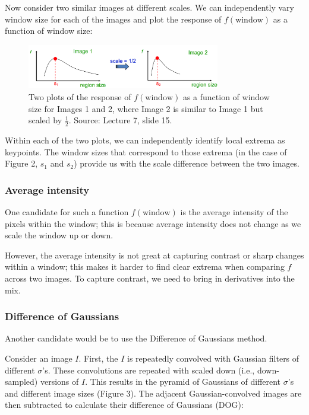 \documentclass{article}
\begin{document}
Now consider two similar images at different scales. We can independently vary window size for each of the images and plot the response of $f(\text{window})$ as a function of window size:

\begin{figure}[h]
  \centering
  \includegraphics[width=0.75\textwidth]{max}
  \caption{Two plots of the response of $f(\text{window})$ as a function of window size for Images 1 and 2, where Image 2 is similar to Image 1 but scaled by $\frac{1}{2}$. Source: Lecture 7, slide 15.}
\end{figure}

Within each of the two plots, we can independently identify local extrema as keypoints. The window sizes that correspond to those extrema (in the case of Figure 2, $s_1$ and $s_2$) provide us with the scale difference between the two images.

\subsubsection{Average intensity}
One candidate for such a function $f(\text{window})$ is the average intensity of the pixels within the window; this is because average intensity does not change as we scale the window up or down.

However, the average intensity is not great at capturing contrast or sharp changes within a window; this makes it harder to find clear extrema when comparing $f$ across two images. To capture contrast, we need to bring in derivatives into the mix.

\subsubsection{Difference of Gaussians}
Another candidate would be to use the Difference of Gaussians method.

Consider an image $I$. First, the $I$ is repeatedly convolved with Gaussian filters of different $\sigma$'s. These convolutions are repeated with scaled down (i.e., down-sampled) versions of $I$. This results in the pyramid of Gaussians of different $\sigma$'s and different image sizes (Figure 3). The adjacent Gaussian-convolved images are then subtracted to calculate their difference of Gaussians (DOG):
\end{document}

